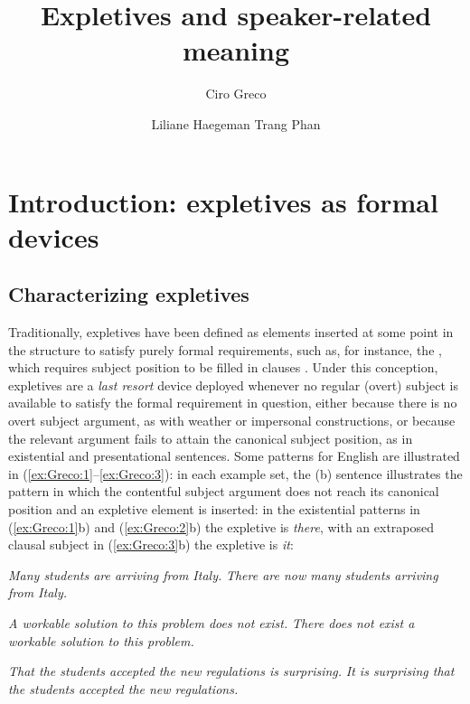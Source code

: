 \documentclass[output=paper]{LSP/langsci}
\author{Ciro Greco\affiliation{Ghent University}\and
	Liliane Haegeman\affiliation{Ghent University}\lastand
	Trang Phan\affiliation{Ghent University/University of Hai Duong}
}
\title{Expletives and speaker-related meaning}
\begin{document}

\section{Introduction: expletives as formal devices}\label{sec:Greco:1}
\subsection{Characterizing expletives}

Traditionally, expletives have been defined as elements inserted at some point in the structure to satisfy purely formal requirements, such as, for instance, the , which requires subject position to be filled in  clauses \citep{Chomsky1981,Chomsky1995}. Under this conception, expletives are a \textit{last resort} device deployed whenever no regular (overt) subject is available to satisfy the formal requirement in question, either because there is no overt subject argument, as with weather or impersonal constructions, or because the relevant argument fails to attain the canonical subject position, as in existential and presentational sentences. Some patterns for English are illustrated in (\ref{ex:Greco:1}--\ref{ex:Greco:3}): in each example set, the (b) sentence illustrates the pattern in which the contentful subject argument does not reach its canonical position and an expletive element is inserted: in the existential patterns in (\ref{ex:Greco:1}b) and (\ref{ex:Greco:2}b) the expletive is \textit{there}, with an extraposed clausal subject in (\ref{ex:Greco:3}b) the expletive is \textit{it}:

\ea%
    \label{ex:Greco:1}
    \ea\label{ex:Greco:1a} \textit{Many students are arriving from Italy.}
    \ex\label{ex:Greco:1b} \textit{There are now many students arriving from Italy.}
   \z
\z

\ea%
    \label{ex:Greco:2}
    \ea\label{ex:Greco:2a} \textit{A workable solution to this problem does not exist.}
    \ex\label{ex:Greco:2b} \textit{There does not exist a workable solution to this problem.}
   \z
\z

\ea%
    \label{ex:Greco:3}
    \ea\label{ex:Greco:3a} \textit{That the students accepted the new regulations is surprising.}
    \ex\label{ex:Greco:3b} \textit{It is surprising that the students accepted the new regulations.}
   \z
\z
\end{document}
